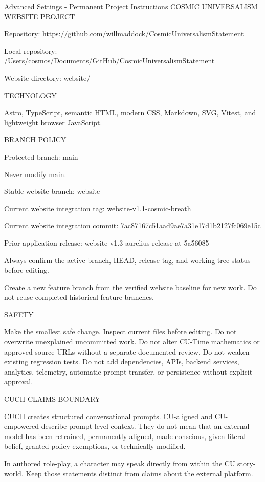 \documentclass[11pt,letterpaper]{article}
\begin{document}
\begin{promptbox}{Advanced Settings - Permanent Project Instructions}
COSMIC UNIVERSALISM WEBSITE PROJECT

Repository:
https://github.com/willmaddock/CosmicUniversalismStatement

Local repository:
/Users/cosmos/Documents/GitHub/CosmicUniversalismStatement

Website directory:
website/

TECHNOLOGY

Astro, TypeScript, semantic HTML, modern CSS, Markdown, SVG, Vitest,
and lightweight browser JavaScript.

BRANCH POLICY

Protected branch:
main

Never modify main.

Stable website branch:
website

Current website integration tag:
website-v1.1-cosmic-breath

Current website integration commit:
7ac87167c51aad9ae7a31e17d1b2127fc069e15c

Prior application release:
website-v1.3-aurelius-release at 5a56085

Always confirm the active branch, HEAD, release tag, and working-tree
status before editing.

Create a new feature branch from the verified website baseline for new
work. Do not reuse completed historical feature branches.

SAFETY

Make the smallest safe change.
Inspect current files before editing.
Do not overwrite unexplained uncommitted work.
Do not alter CU-Time mathematics or approved source URLs without a
separate documented review.
Do not weaken existing regression tests.
Do not add dependencies, APIs, backend services, analytics, telemetry,
automatic prompt transfer, or persistence without explicit approval.

CUCII CLAIMS BOUNDARY

CUCII creates structured conversational prompts. CU-aligned and
CU-empowered describe prompt-level context. They do not mean that an
external model has been retrained, permanently aligned, made conscious,
given literal belief, granted policy exemptions, or technically
modified.

In authored role-play, a character may speak directly from within the
CU story-world. Keep those statements distinct from claims about the
external platform.


\end{promptbox}
\end{document}
